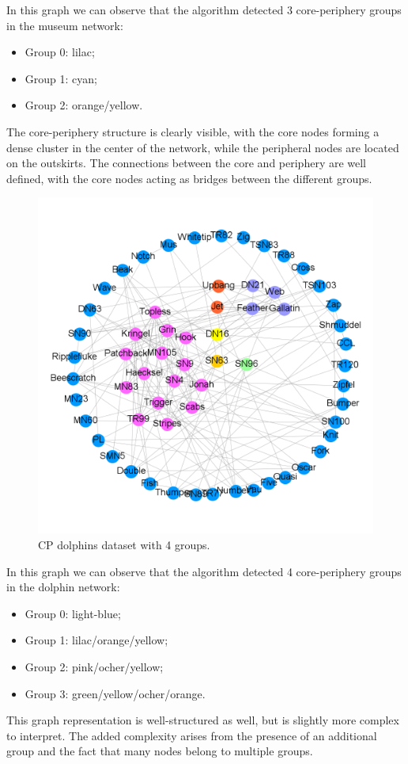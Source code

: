 \documentclass[sigconf]{acmart}
\begin{document}
\FloatBarrier
\noindent In this graph we can observe that the algorithm detected 3 core-periphery groups in the museum network:
\begin{itemize}
    \item Group 0: lilac;
    \item Group 1: cyan;
    \item Group 2: orange/yellow.
\end{itemize}
The core-periphery structure is clearly visible, with the core nodes forming a dense cluster in the center of the network, while the peripheral nodes are located on the outskirts. The connections between the core and periphery are well defined, with the core nodes acting as bridges between the different groups.

\FloatBarrier
\begin{figure}[h]
    \centering
    \includegraphics[width=1.05\linewidth]{Img/dolphins 4 groups.png}
    \caption{CP dolphins dataset with 4 groups.}
    \label{fig:general cp}
\end{figure}
\FloatBarrier
\noindent In this graph we can observe that the algorithm detected 4 core-periphery groups in the dolphin network:
\begin{itemize}
    \item Group 0: light-blue;
    \item Group 1: lilac/orange/yellow;
    \item Group 2: pink/ocher/yellow;
    \item Group 3: green/yellow/ocher/orange.
\end{itemize}
This graph representation is well-structured as well, but is slightly more complex to interpret. The added complexity arises from the presence of an additional group and the fact that many nodes belong to multiple groups.
\end{document}
